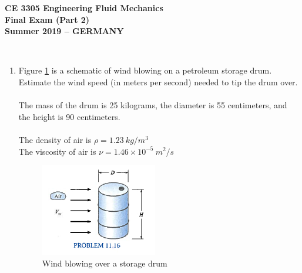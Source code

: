 \documentclass[12pt]{article}
\begin{document}
\begingroup
\begin{center}
{\textbf{{ CE 3305 Engineering Fluid Mechanics} \\ Final Exam (Part 2) \\ Summer 2019 -- GERMANY} }
\end{center}
\endgroup
\begingroup
~\newline

\begin{enumerate}
%


\item Figure \ref{fig:WindDrum} is a schematic of wind blowing on a petroleum storage drum.  Estimate the wind speed (in meters per second) needed to tip the drum over.  \\~\\ The mass of the drum is 25 kilograms, the diameter is 55 centimeters, and the height is 90 centimeters.  \\~\\The density of air is $\rho = 1.23~kg/m^3$  \\ The viscosity of air is $\nu = 1.46 \times 10^{-5}~m^2/s$
\begin{figure}[htbp] %
   \centering
   \includegraphics[width=2in]{WindDrum.jpg} 
   \caption{Wind blowing over a storage drum}
   \label{fig:WindDrum}
\end{figure}


\end{enumerate}
\end{document}
